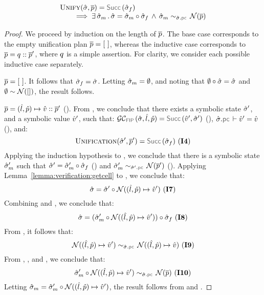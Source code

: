 \begin{lemma}
$$
\begin{array}{l}
\unificationfun(\sstate, \jvec{\spass}) = \success{\sstate_f} \\ \quad \quad
  \implies 
   \exists \, \sstate_m \, . \, 
   \sstate = \sstate_m \statecompose \sstate_f 
   \, \wedge \, 
    \stateequivrel{\sstate_m}{\normaliser(\jvec{\spass})}{\sstate.\pcsel}
\end{array}
$$
\end{lemma}
\begin{proof}
We proceed by induction on the length of $\overline{p}$. The base case corresponds to the empty unification plan $\overline{p} = [ \ ]$, 
whereas the inductive case corresponds to $\overline{p} = q :: \overline{p}'$, where $q$ is a simple 
assertion. For clarity, we consider each possible inductive case separately. 
\vspace{3pt}

\noindent {} $\overline{p} = [ \ ]$. It follows that
$\hat{\sigma}_f = \hat{\sigma}$. Letting  $\hat{\sigma}_m = \emptyset$, 
and noting that $\emptyset \circ \hat{\sigma} = \hat{\sigma}$ and $\emptyset \sim \mathcal{N}([])$, the result follows. 
 \vspace{5pt}

\noindent {} 
$\overline{p} = (\hat{l}, \hat{p}) \mapsto \hat{v} :: \overline{p}'$ (). 
From , we conclude that there exists a symbolic state $\hat{\sigma}'$, 
and a symbolic value $\hat{v}'$, such that: 
$\GetCellV{\sstate, \sloc, \sexprp} = \success{\sexprv', \sstate'}$ (),
$\sstate.\pcsel \vdash \sexprv' = \sexprv$ (), and:
$$
\unificationfunction(\sstate', \jvec{\spass}') = \success{\sstate_f} \text{ (\ieq{4})}
$$ 
Applying the induction hypothesis to , we conclude that there is a symbolic state 
$\hat{\sigma}_m'$ such that  $\hat{\sigma}' = \hat{\sigma}_m' \circ \hat{\sigma}_f$ () and 
$\stateequivrel{\sstate_m'}{\normaliser(\jvec{\spass}')}{\sstate'.\pcsel}$ (). 
Applying Lemma~\ref{lemma:verification:getcell} to , we conclude that:
$$\hat{\sigma} = \hat{\sigma}' \circ \mathcal{N}((\hat{l}, \hat{p}) \mapsto \hat{v}') \text{ ({\bf I7})}$$   
Combining  and , we conclude that: 
$$
\hat{\sigma} = (\hat{\sigma}_m' \circ \mathcal{N}((\hat{l}, \hat{p}) \mapsto \hat{v}')) \circ \hat{\sigma}_f  \text{ ({\bf I8})}
$$
From , it follows that: 
$$
\stateequivrel{\normaliser((\sloc, \sexprp) \pointsto \sexprv')}{\normaliser((\sloc, \sexprp) \pointsto \sexprv)}{\sstate.\pcsel} \text{ (\ieq{9})}
$$
From , , and , we conclude that: 
$$
\stateequivrel{\sstate_m' \statecompose \normaliser((\sloc, \sexprp) \pointsto \sexprv')}{\normaliser(\jvec{\spass})}{\sstate.\pcsel} \text{ (\ieq{10})}
$$
Letting $\hat{\sigma}_m = \hat{\sigma}_m' \circ \mathcal{N}((\hat{l}, \hat{p}) \mapsto \hat{v}')$, the result follows 
from  and . 
\vspace{5pt}


\end{proof}

